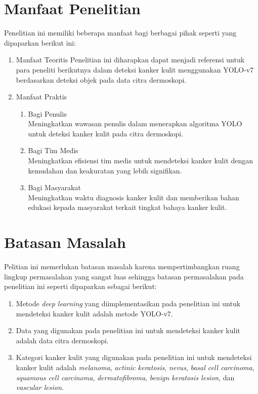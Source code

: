     \section{Manfaat Penelitian}
    Penelitian ini memiliki beberapa manfaat bagi berbagai pihak seperti yang dipaparkan berikut ini:
    \begin{enumerate}
        \item Manfaat Teoritis
        Penelitian ini diharapkan dapat menjadi referensi untuk para peneliti berikutnya dalam deteksi kanker kulit menggunakan YOLO-v7 berdasarkan deteksi objek pada data citra dermoskopi.

        \item Manfaat Praktis
        \begin{enumerate}
            \item Bagi Penulis\\
            Meningkatkan wawasan penulis dalam menerapkan algoritma YOLO untuk deteksi kanker kulit pada citra dermoskopi.

            \item Bagi Tim Medis\\
            Meningkatkan efisiensi tim medis untuk mendeteksi kanker kulit dengan kemudahan dan keakuratan yang lebih signifikan.

            \item Bagi Masyarakat\\
            Meningkatkan waktu diagnosis kanker kulit dan memberikan bahan edukasi kepada masyarakat terkait tingkat bahaya kanker kulit.
        \end{enumerate}
    \end{enumerate}

    \section{Batasan Masalah}
    Pelitian ini memerlukan batasan masalah karena mempertimbangkan ruang lingkup permasalahan yang sangat luas sehingga batasan permasalahan pada penelitian ini seperti dipaparkan sebagai berikut:
    \begin{enumerate}
        \item Metode \textit{deep learning} yang diimplementasikan pada penelitian ini untuk mendeteksi kanker kulit adalah metode YOLO-v7.
        \item Data yang digunakan pada penelitian ini untuk mendeteksi kanker kulit adalah data citra dermoskopi.
        \item Kategori kanker kulit yang digunakan pada penelitian ini untuk mendeteksi kanker kulit adalah \textit{melanoma}, \textit{actinic keratosis}, \textit{nevus}, \textit{basal cell carcinoma}, \textit{squamous cell carcinoma}, \textit{dermatofibroma}, \textit{benign keratosis lesion}, dan \textit{vascular lesion}.
    \end{enumerate}

